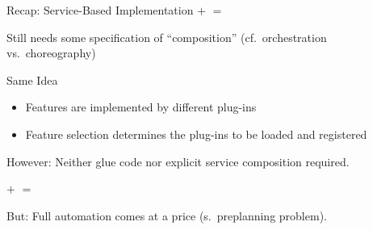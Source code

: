 \begin{frame}{\myframetitle}
	\begin{mycolumns}[widths={40,60},animation=none]
		\begin{example}{Recap: Service-Based Implementation}
				\vspace*{\fill}
					$+$ 
				\vspace*{\fill}	
				\vspace*{\fill}
					$=$ 
				\vspace*{\fill}	
		\end{example}	
		\begin{example}{Still needs some specification of ``composition'' (cf.\ orchestration vs.\ choreography)}
			\centering
		\end{example}
	\mynextcolumn		
		\pause
		\begin{definition}{Same Idea}
			\begin{itemize}
				\item Features are implemented by different plug-ins
				\item Feature selection determines the plug-ins to be loaded and registered 
			\end{itemize}
		\end{definition}
		\pause
		\begin{note}{}
				However: Neither glue code nor explicit service composition required.
		\end{note}
		\begin{example}{}
				\vspace*{\fill}
					$+$ 
				\vspace*{\fill}	
				\vspace*{\fill}
					$=$ 
				\vspace*{\fill}	
		\end{example}
		\pause
		\begin{note}{}
				But: Full automation comes at a price (s.\ preplanning problem).
		\end{note}	
	\end{mycolumns}	
\end{frame}

